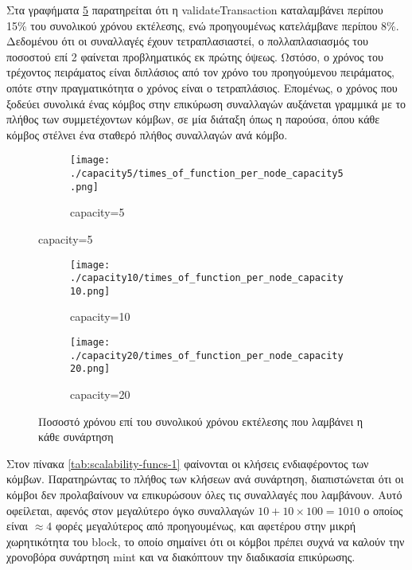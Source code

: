 \documentclass{article}
\newcommand{\eng}[1]{\foreignlanguage{english}{#1}} %
\begin{document}
Στα γραφήματα \ref{fig:scalability-funcs} παρατηρείται ότι η
\eng{validateTransaction} καταλαμβάνει περίπου 15\% του συνολικού χρόνου
εκτέλεσης, ενώ προηγουμένως κατελάμβανε περίπου 8\%. Δεδομένου ότι οι
συναλλαγές έχουν τετραπλασιαστεί, ο πολλαπλασιασμός του ποσοστού επί 2 φαίνεται
προβληματικός εκ πρώτης όψεως. Ωστόσο, ο χρόνος του τρέχοντος πειράματος είναι
διπλάσιος από τον χρόνο του προηγούμενου πειράματος, οπότε στην πραγματικότητα
ο χρόνος είναι ο τετραπλάσιος. Επομένως, ο χρόνος που ξοδεύει συνολικά ένας
κόμβος στην επικύρωση συναλλαγών αυξάνεται γραμμικά με το πλήθος των συμμετέχοντων
κόμβων, σε μία διάταξη όπως η παρούσα, όπου κάθε κόμβος στέλνει ένα σταθερό πλήθος
συναλλαγών ανά κόμβο.

\begin{figure}[ht]
    \centering
    \begin{subfigure}{\textwidth}
        \texttt{[image: ./capacity5/times\_of\_function\_per\_node\_capacity5.png]}
        \caption{\eng{capacity=5}}
        \label{fig:scalability-funcs-5}
    \end{subfigure}
\end{figure}
\begin{figure}[ht]
    \ContinuedFloat
    \begin{subfigure}{\textwidth}
        \texttt{[image: ./capacity10/times\_of\_function\_per\_node\_capacity10.png]}
        \caption{\eng{capacity=10}}
        \label{fig:scalability-funcs-10}
    \end{subfigure}
    \centering
    \begin{subfigure}{\textwidth}
        \texttt{[image: ./capacity20/times\_of\_function\_per\_node\_capacity20.png]}
        \caption{\eng{capacity=20}}
        \label{fig:scalability-funcs-20}
    \end{subfigure}
    \caption{Ποσοστό χρόνου επί του συνολικού χρόνου εκτέλεσης που λαμβάνει η κάθε συνάρτηση}
    \label{fig:scalability-funcs}
\end{figure}
\FloatBarrier


Στον πίνακα \ref{tab:scalability-funcs-1} φαίνονται οι κλήσεις ενδιαφέροντος
των κόμβων. Παρατηρώντας το πλήθος των κλήσεων ανά συνάρτηση, διαπιστώνεται ότι
οι κόμβοι δεν προλαβαίνουν να επικυρώσουν όλες τις συναλλαγές που λαμβάνουν.
Αυτό οφείλεται, αφενός στον μεγαλύτερο όγκο συναλλαγών $10 + 10 \times 100 =
1010$ ο οποίος είναι $\approx 4$ φορές μεγαλύτερος από προηγουμένως, και
αφετέρου στην μικρή χωρητικότητα του \eng{block}, το οποίο σημαίνει ότι οι
κόμβοι πρέπει συχνά να καλούν την χρονοβόρα συνάρτηση \eng{mint} και να
διακόπτουν την διαδικασία επικύρωσης.
\end{document}

